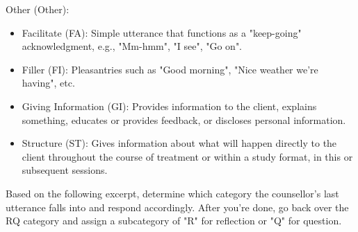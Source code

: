 \begin{tcolorbox}
Other (Other):
\begin{itemize}[itemsep=0pt, parsep=0pt]
    \item Facilitate (FA): Simple utterance that functions as a "keep-going" acknowledgment, e.g., "Mm-hmm", "I see", "Go on".
    \item Filler (FI): Pleasantries such as "Good morning", "Nice weather we're having", etc.
    \item Giving Information (GI): Provides information to the client, explains something, educates or provides feedback, or discloses personal information.
    \item Structure (ST): Gives information about what will happen directly to the client throughout the course of treatment or within a study format, in this or subsequent sessions.
\end{itemize}

Based on the following excerpt, determine which category the counsellor's last utterance falls into and respond accordingly. After you're done, go back over the RQ category and assign a subcategory of "R" for reflection or "Q" for question.
\end{tcolorbox}




